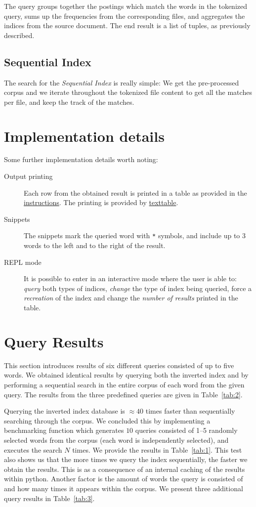 \documentclass{article}
\begin{document}
The query groups together the postings which match the words in the tokenized query, sums up the frequencies from the corresponding files, and aggregates the indices from the source document. The end result is a list of tuples, as previously described.

\subsection{Sequential Index}
The search for the \textit{Sequential Index} is really simple: We get the pre-processed corpus and we iterate throughout the tokenized file content to get all the matches per file, and keep the track of the matches.

\section{Implementation details}
Some further implementation details worth noting:
\begin{description}
	\item[Output printing] Each row from the obtained result is printed in a table as provided in the \href{http://zitnik.si/teaching/wier/PA3.html}{instructions}. The printing is provided by \href{https://pypi.org/project/texttable/}{texttable}.
	
	\item[Snippets] The snippets mark the queried word with \texttt{*} symbols, and include up to 3 words to the left and to the right of the result.
	
	\item[REPL mode] It is possible to enter in an interactive mode where the user is able to: \textit{query} both types of indices, \textit{change} the type of index being queried, force a \textit{recreation} of the index and change the \textit{number of results} printed in the table.
\end{description}
\section{Query Results}
This section introduces results of six different queries consisted of up to five words. We obtained identical results by querying both the inverted index and by performing a sequential search in the entire corpus of each word from the given query. The results from the three predefined queries are given in Table~\ref{tab:2}.

Querying the inverted index database is $\approx40$ times faster than sequentially searching through the corpus. We concluded this by implementing a benchmarking function which generates $10$ queries consisted of \numrange{1}{5} randomly selected words from the corpus (each word is independently selected), and executes the search $N$ times. We provide the results in Table~\ref{tab:1}. This test also shows us that the more times we query the index sequentially, the faster we obtain the results. This is as a consequence of an internal caching of the results within python. Another factor is the amount of words the query is consisted of and how many times it appears within the corpus. We present three additional query results in Table~\ref{tab:3}.
\end{document}
